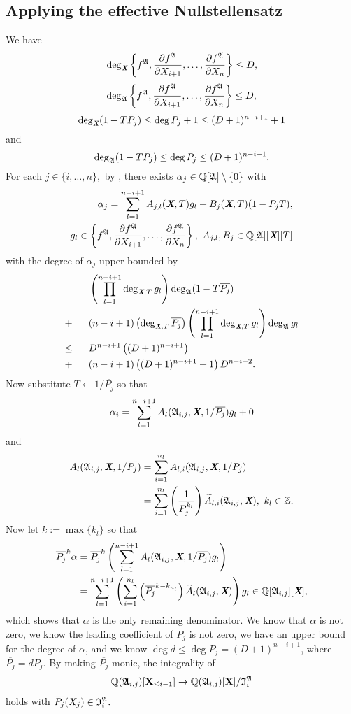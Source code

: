 \documentclass[sigconf]{acmart}
\def\Xb{\textit{\textbf{X}}}
\def\pjb{\overline{P_{j}}}
\def\Q{\mathbb{Q}}
\def\At{\widetilde{A}}
\def\I{\frak{I}}
\def\A{\frak{A}}
\begin{document}
\subsection{Applying the effective Nullstellensatz}
%
We have
\[
\deg_{\Xb}\left\{ 
f^\A,\frac{\partial f^\A}{\partial X_{i+1}},\hdots,\frac{\partial f^\A}{\partial X_n}
\right\}\leq D,
\]
\[
\deg_{\A}  
\left\{ 
f^\A,\frac{\partial f^\A}{\partial X_{i+1}},\hdots,\frac{\partial f^\A}{\partial X_n}
\right\} \leq D,
\]
\[
\deg_{\Xb}(1-T\pjb) \leq \deg \pjb +1 \leq (D+1)^{n-i+1}+1
\]
and
\[
\deg_{\A}(1-T\pjb) \leq \deg \pjb\leq (D+1)^{n-i+1}.
\]
For each $j \in \{i,\hdots,n\},$ by \cite[Theorem 0.5]{EN}, there exists $\alpha_j \in \mathbb{Q}[\A]\setminus\{0\}$ with 
%
\begin{align*}
\alpha_j = \sum_{l=1}^{n-i+1} A_{j,l}(\textit{\textbf{X}},T)g_l + B_j(\textit{\textbf{X}},T)(1-\pjb T), \\ g_l \in 
\left\{ 
f^\A,\frac{\partial f^\A}{\partial X_{i+1}},\hdots,\frac{\partial f^\A}{\partial X_n}
\right\},~ A_{j,l},B_j \in \mathbb{Q}[\A][\Xb][T]
\end{align*}
%
with the degree of $\alpha_j$ upper bounded by
%
\begin{align*}
    &\left(\prod_{l=1}^{n-i+1} \deg_{\Xb,T} g_l\right)\deg_{\A} (1-T\pjb)\\ 
    + ~~~~~&(n-i+1)\left(\deg_{\Xb,T}\pjb\right)\left(\prod_{l=1}^{n-i+1}\deg_{\Xb,T} g_l \right)\deg_{\A} g_l\\
    \leq ~~~~~&D^{n-i+1}\left( (D+1)^{n-i+1}\right)\\
    +~~~~~&(n-i+1)\left( (D+1)^{n-i+1}+1\right)D^{n-i+2}.
\end{align*}
%
Now substitute $T \leftarrow 1/\pjb$ so that 
\[
\alpha_i = \sum_{l=1}^{n-i+1} A_l(\A_{i,j},\textit{\textbf{X}},1/\pjb)g_l + 0
\]
and
%
\begin{align*}
A_l(\A_{i,j},\textit{\textbf{X}},1/\pjb) &= \sum_{i=1}^{n_l} A_{l,i}(\A_{i,j},\Xb,1/\pjb)\\
&= \sum_{i=1}^{n_l} \left(\frac{1}{P_j^{k_l}}\right)\At_{l,i}(\A_{i,j},\textit{\textbf{X}}), ~k_l \in \mathbb{Z}.
\end{align*}
%
Now let $k := \max\{k_l\}$ so that 
%
\begin{align*}
    \pjb^k \alpha &= \pjb^k\left(\sum_{l=1}^{n-i+1} A_l(\A_{i,j},\textit{\textbf{X}},1/\pjb)g_l\right)\\
    &= \sum_{l=1}^{n-i+1}\left( \sum_{i=1}^{n_l}\left(\pjb^{k-k_{n_l}}\right)\At_l(\A_{i,j},\Xb) \right)g_l \in \Q[\A_{i,j}][\Xb],
\end{align*}
%
which shows that $\alpha$ is the only remaining denominator. We know that $\alpha$ is not zero, we know the leading coefficient of $\overline{P_j}$ is not zero, we have an upper bound for the degree of $\alpha$, and we know $\deg d \leq \deg P_j = (D+1)^{n-i+1}$, where $\pjb=dP_j.$ By making $\pjb$ monic, the integrality of 
\begin{align*}\mathbb{Q}(\frak{A}_{i,j})[\textbf{X}_{\leq i-1}]\rightarrow\mathbb{Q}(\frak{A}_{i,j})[\textbf{X}]/\I_i^{\A}
\end{align*}
holds with $\pjb(X_j)\in \I_i^{\A}.$
%
\end{document}
